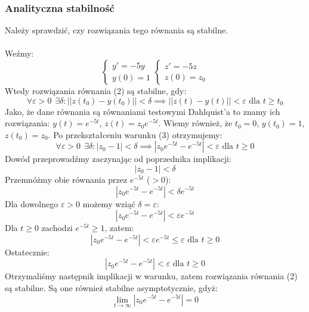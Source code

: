 \documentclass{article}
\begin{document}
\subsubsection{Analityczna stabilność}
Należy sprawdzić, czy rozwiązania tego równania są stabilne.
\\\\
Weźmy:
\begin{equation}
    \begin{cases}
        y' = -5y \\
        y(0) = 1
    \end{cases} \nonumber
    \begin{cases}
        z' = -5z \\
        z(0) = z_0
    \end{cases} \nonumber
\end{equation}
Wtedy rozwiązania równania (2) są stabilne, gdy:
\begin{equation}
    \forall\varepsilon>0\ \ \exists\delta: ||z(t_0) - y(t_0)|| < \delta \implies ||z(t) - y(t)|| < \varepsilon \text{ dla } t \geq t_0
\end{equation}
Jako, że dane równania są równaniami testowymi Dahlquist'a to znamy ich rozwiązania: $y(t) = e^{-5t}$, $z(t) = z_0e^{-5t}$. Wiemy również, że $t_0 = 0$, $y(t_0) = 1$, $z(t_0) = z_0$. Po przekształceniu warunku (3) otrzymujemy:
$$\forall\varepsilon>0\ \ \exists\delta: |z_0 - 1| < \delta \implies |z_0e^{-5t} - e^{-5t}| < \varepsilon \text{ dla } t \geq 0$$
Dowód przeprowadźmy zaczynając od poprzednika implikacji:
$$|z_0 - 1| < \delta$$
Przemnóżmy obie równania przez $e^{-5t}$ ($>0$):
$$|z_0e^{-5t} - e^{-5t}| < \delta e^{-5t}$$
Dla dowolnego $\varepsilon>0$ możemy wziąć $\delta = \varepsilon$:
$$|z_0e^{-5t} - e^{-5t}| < \varepsilon e^{-5t}$$
Dla $t \geq 0$ zachodzi $e^{-5t} \geq 1$, zatem:
$$|z_0e^{-5t} - e^{-5t}| < \varepsilon e^{-5t} \leq \varepsilon \text{ dla } t \geq 0$$
Ostatecznie:
$$|z_0e^{-5t} - e^{-5t}| < \varepsilon \text{ dla } t \geq 0$$
Otrzymaliśmy następnik implikacji w warunku, zatem rozwiązania równania (2) są stabilne. Są one również stabilne asymptotycznie, gdyż:
$$\lim_{t\to\infty} |z_0e^{-5t} - e^{-5t}| = 0$$
\end{document}
